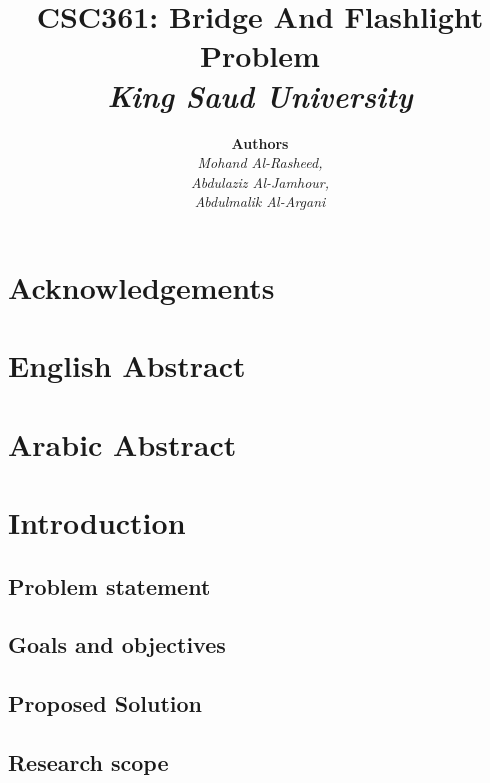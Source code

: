 \documentclass[12pt]{diazessay}
\title{\textbf{CSC361: Bridge And Flashlight Problem} \\ {\Large\itshape King Saud University}}
\author{\textbf{Authors} \\ \textit{Mohand Al-Rasheed,\\}\textit{Abdulaziz Al-Jamhour,\\}\textit{Abdulmalik Al-Argani}}
\date{}
\begin{document}
\maketitle %
\clearpage


\tableofcontents

\cleardoublepage

\section*{Acknowledgements}

\section*{English Abstract}

\section*{Arabic Abstract}

\section{Introduction}

    \subsection{Problem statement}
    
    
    \subsection{Goals and objectives}
    
    
    \subsection{Proposed Solution}
    
    
    \subsection{Research scope}
    
\end{document}

